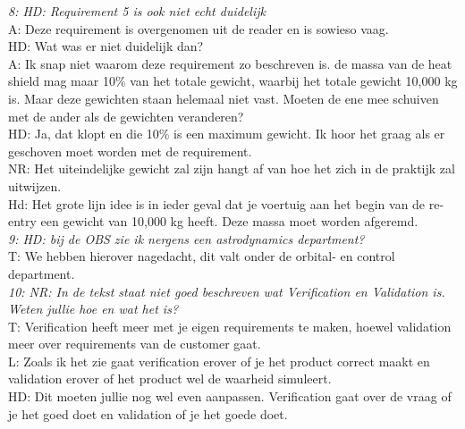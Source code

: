 \textit{8: HD: Requirement 5 is ook niet echt duidelijk}\\
A: Deze requirement is overgenomen uit de reader en is sowieso vaag.\\
HD: Wat was er niet duidelijk dan?\\
A: Ik snap niet waarom deze requirement zo beschreven is. de massa van de heat shield mag maar 10\% van het totale gewicht, waarbij het totale gewicht 10,000 kg is. Maar deze gewichten staan helemaal niet vast. Moeten de ene mee schuiven met de ander als de gewichten veranderen?\\
HD: Ja, dat klopt en die 10\% is een maximum gewicht. Ik hoor het graag als er geschoven moet worden met de requirement.\\
NR: Het uiteindelijke gewicht zal zijn hangt af van hoe het zich in de praktijk zal uitwijzen.\\
Hd: Het grote lijn idee is in ieder geval dat je voertuig aan het begin van de re-entry een gewicht van 10,000 kg heeft. Deze massa moet worden afgeremd.\\

\textit{9: HD: bij de OBS zie ik nergens een astrodynamics department?}\\
T: We hebben hierover nagedacht, dit valt onder de orbital- en control department.\\

\textit{10: NR: In de tekst staat niet goed beschreven wat Verification en Validation is. Weten jullie hoe en wat het is?}\\
T: Verification heeft meer met je eigen requirements te maken, hoewel validation meer over requirements van de customer gaat.\\
L: Zoals ik het zie gaat verification erover of je het product correct maakt en validation erover of het product wel de waarheid simuleert.\\
HD: Dit moeten jullie nog wel even aanpassen. Verification gaat over de vraag of je het goed doet en validation of je het goede doet.\\


